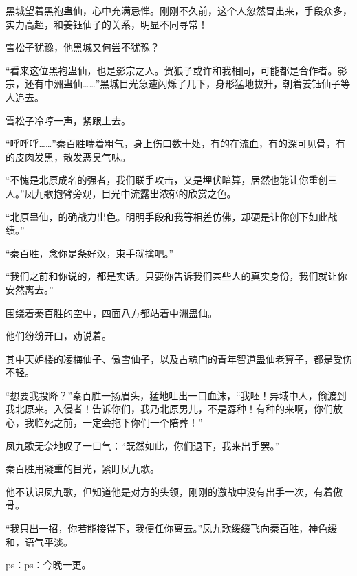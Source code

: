 \begin{this_body}
黑城望着黑袍蛊仙，心中充满忌惮。刚刚不久前，这个人忽然冒出来，手段众多，实力高超，和姜钰仙子的关系，明显不同寻常！

雪松子犹豫，他黑城又何尝不犹豫？

“看来这位黑袍蛊仙，也是影宗之人。贺狼子或许和我相同，可能都是合作者。影宗，还有中洲蛊仙……”黑城目光急速闪烁了几下，身形猛地拔升，朝着姜钰仙子等人追去。

雪松子冷哼一声，紧跟上去。

“呼呼呼……”秦百胜喘着粗气，身上伤口数十处，有的在流血，有的深可见骨，有的皮肉发黑，散发恶臭气味。

“不愧是北原成名的强者，我们联手攻击，又是埋伏暗算，居然也能让你重创三人。”凤九歌抱臂旁观，目光中流露出浓郁的欣赏之色。

“北原蛊仙，的确战力出色。明明手段和我等相差仿佛，却硬是让你创下如此战绩。”

“秦百胜，念你是条好汉，束手就擒吧。”

“我们之前和你说的，都是实话。只要你告诉我们某些人的真实身份，我们就让你安然离去。”

围绕着秦百胜的空中，四面八方都站着中洲蛊仙。

他们纷纷开口，劝说着。

其中天妒楼的凌梅仙子、傲雪仙子，以及古魂门的青年智道蛊仙老算子，都是受伤不轻。

“想要我投降？”秦百胜一扬眉头，猛地吐出一口血沫，“我呸！异域中人，偷渡到我北原来。入侵者！告诉你们，我乃北原男儿，不是孬种！有种的来啊，你们放心，我临死之前，一定会拖下你们一个陪葬！”

凤九歌无奈地叹了一口气：“既然如此，你们退下，我来出手罢。”

秦百胜用凝重的目光，紧盯凤九歌。

他不认识凤九歌，但知道他是对方的头领，刚刚的激战中没有出手一次，有着傲骨。

“我只出一招，你若能接得下，我便任你离去。”凤九歌缓缓飞向秦百胜，神色缓和，语气平淡。

ps：ps：今晚一更。

\end{this_body}

